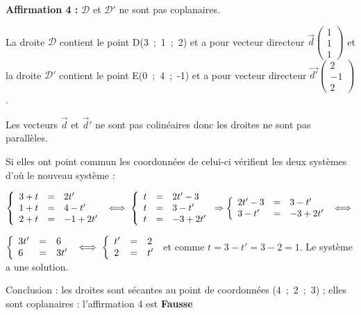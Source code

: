\documentclass[10pt]{article}
\providecommand{\vect}[1]{\overrightarrow{#1}}
\begin{document}
\textbf{Affirmation 4 :} $\mathcal{D}$ et $\mathcal{D}'$ ne sont pas coplanaires.

La droite $\mathcal{D}$ contient le point D(3~;~1~;~2) et a pour vecteur directeur $\vect{d}\begin{pmatrix}1\\1\\1\end{pmatrix}$ et la droite $\mathcal{D}'$ contient le point E(0~;~4~;~-1) et a pour vecteur directeur $\vect{d'}\begin{pmatrix}2\\-1\\2\end{pmatrix}$.

Les vecteurs $\vect{d}$ et $\vect{d}'$ ne sont pas colinéaires donc les droites ne sont pas parallèles.

Si elles ont point commun les coordonnées de celui-ci vérifient les deux systèmes d'où le nouveau système :

$\left\{\begin{array}{l c l}
3+t&=&2t'\\
1+t&=&4 - t'\\
2+t&=& - 1+ 2t'
\end{array}\right.\iff \left\{\begin{array}{l c l}
t&=&2t' - 3\\
t&=&3 - t'\\
t&=& - 3+ 2t'
\end{array}\right. \Rightarrow \left\{\begin{array}{l c l}
2t' - 3&=&3 - t'\\
3 - t'&=& - 3+ 2t'
\end{array}\right. \iff $

$\left\{\begin{array}{l c l}
3t' &=&6 \\
6&=& 3t'
\end{array}\right. \iff \left\{\begin{array}{l c l}
t' &=&2 \\
2&=& t'
\end{array}\right.$ et comme $t = 3 - t' = 3 - 2 = 1$. Le système a une solution.

Conclusion : les droites  sont sécantes au point de coordonnées (4~;~2~;~3) ; elles sont coplanaires : l'affirmation 4 est \textbf{Fausse}
\bigskip
\end{document}
